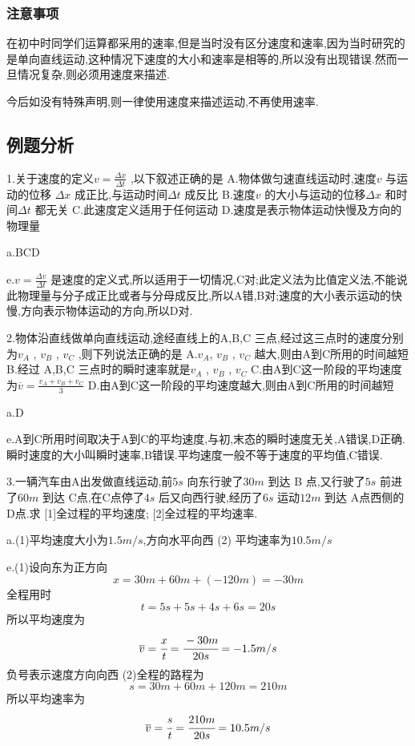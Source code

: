 \subsubsection{注意事项}
在初中时同学们运算都采用的速率,但是当时没有区分速度和速率,因为当时研究的是单向直线运动,这种情况下速度的大小和速率是相等的,所以没有出现错误.然而一旦情况复杂,则必须用速度来描述.

今后如没有特殊声明,则一律使用速度来描述运动,不再使用速率.

\subsection{例题分析}
\begin{selection}
  1.关于速度的定义$v=\frac{\Delta x}{\Delta t}$ ,以下叙述正确的是
  A.物体做匀速直线运动时,速度$v$ 与运动的位移 $\Delta x$ 成正比,与运动时间$\Delta t$ 成反比
  B.速度$v$ 的大小与运动的位移$\Delta x$ 和时间$\Delta t$ 都无关
  C.此速度定义适用于任何运动
  D.速度是表示物体运动快慢及方向的物理量

  a.BCD

  e.$v=\frac{\Delta v}{\Delta t}$ 是速度的定义式,所以适用于一切情况,C对;此定义法为比值定义法,不能说此物理量与分子成正比或者与分母成反比,所以A错,B对;速度的大小表示运动的快慢,方向表示物体运动的方向,所以D对.

  2.物体沿直线做单向直线运动,途经直线上的A,B,C 三点,经过这三点时的速度分别为$v_A$ , $v_B$ , $v_C$ ,则下列说法正确的是
  A.$v_A$, $v_B$ , $v_C$ 越大,则由A到C所用的时间越短
  B.经过 A,B,C 三点时的瞬时速率就是$v_A$ , $v_B$ , $v_C$
  C.由A到C这一阶段的平均速度为$\overline{v}=\frac{v_A+v_B+v_C}{3}$
  D.由A到C这一阶段的平均速度越大,则由A到C所用的时间越短

  a.D

  e.A到C所用时间取决于A到C的平均速度,与初,末态的瞬时速度无关,A错误,D正确.瞬时速度的大小叫瞬时速率,B错误.平均速度一般不等于速度的平均值,C错误.

\end{selection}

\begin{calculate}
3.一辆汽车由A出发做直线运动,前$5s$ 向东行驶了$30m$ 到达 B 点,又行驶了$5s$ 前进了$60m$ 到达 C点,在C点停了$4s$ 后又向西行驶,经历了$6s$  运动$12m$ 到达 A点西侧的D点.求
[1]全过程的平均速度;
[2]全过程的平均速率.

a.(1)平均速度大小为$1.5m/s$,方向水平向西 (2) 平均速率为$10.5m/s$

e.(1)设向东为正方向
$$x=30m+60m+(-120m)=-30m$$
全程用时
$$t=5s+5s+4s+6s=20s$$
所以平均速度为
$$\overline{v}=\cfrac{x}{t}=\cfrac{-30m}{20s}=-1.5m/s$$
负号表示速度方向向西
\newline
(2)全程的路程为
$$s=30m+60m+120m=210m$$
所以平均速率为
$$\overline{v}=\cfrac{s}{t}=\cfrac{210m}{20s}=10.5m/s$$


\end{calculate}

